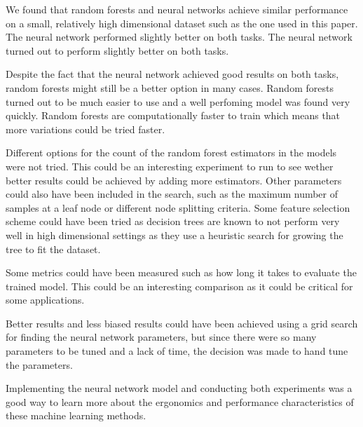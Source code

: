
We found that random forests and neural networks achieve similar performance on a small, relatively high dimensional dataset such as the one used in this paper. The neural network performed slightly better on both tasks. The neural network turned out to perform slightly better on both tasks.

Despite the fact that the neural network achieved good results on both tasks, random forests might still be a better option in many cases. Random forests turned out to be much easier to use and a well perfoming model was found very quickly. Random forests are computationally faster to train which means that more variations could be tried faster.

Different options for the count of the random forest estimators in the models were not tried. This could be an interesting experiment to run to see wether better results could be achieved by adding more estimators. Other parameters could also have been included in the search, such as the maximum number of samples at a leaf node or different node splitting criteria. Some feature selection scheme could have been tried as decision trees are known to not perform very well in high dimensional settings as they use a heuristic search for growing the tree to fit the dataset.

Some metrics could have been measured such as how long it takes to evaluate the trained model. This could be an interesting comparison as it could be critical for some applications.

Better results and less biased results could have been achieved using a grid search for finding the neural network parameters, but since there were so many parameters to be tuned and a lack of time, the decision was made to hand tune the parameters.

Implementing the neural network model and conducting both experiments was a good way to learn more about the ergonomics and performance characteristics of these machine learning methods.

